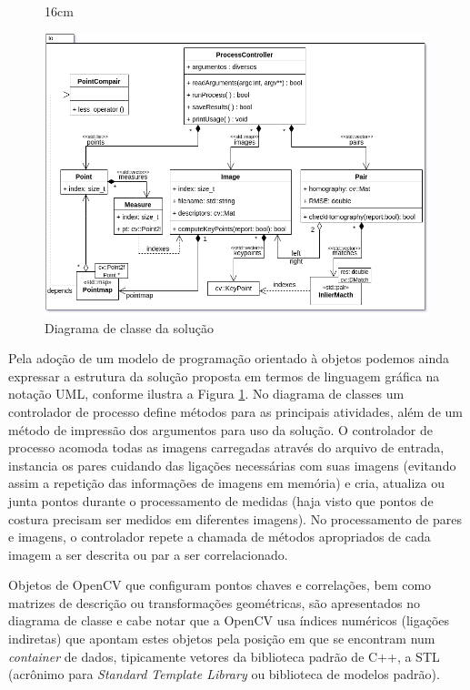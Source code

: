 \begin{figure}[!h]{16cm}
  \caption{Diagrama de classe da solução} \label{classdiagram}
  \includegraphics[width=\hsize]{figuras/classdiagram.png}
\end{figure}

Pela adoção de um modelo de programação orientado à objetos podemos ainda expressar a estrutura da solução proposta em termos de linguagem gráfica na notação UML, conforme ilustra a Figura \ref{classdiagram}. No diagrama de classes um controlador de processo define métodos para as principais atividades, além de um método de impressão dos argumentos para uso da solução. O controlador de processo acomoda todas as imagens carregadas através do arquivo de entrada, instancia os pares cuidando das ligações necessárias com suas imagens (evitando assim a repetição das informações de imagens em memória) e cria, atualiza ou junta pontos durante o processamento de medidas (haja visto que pontos de costura precisam ser medidos em diferentes imagens). No processamento de pares e imagens, o controlador repete a chamada de métodos apropriados de cada imagem a ser descrita ou par a ser correlacionado. 

Objetos de OpenCV que configuram pontos chaves e correlações, bem como matrizes de descrição ou transformações geométricas, são apresentados no diagrama de classe e cabe notar que a OpenCV usa índices numéricos (ligações indiretas) que apontam estes objetos pela posição em que se encontram num \textit{container} de dados, tipicamente vetores da biblioteca padrão de C++, a STL (acrônimo para \textit{Standard Template Library} ou biblioteca de modelos padrão). 

